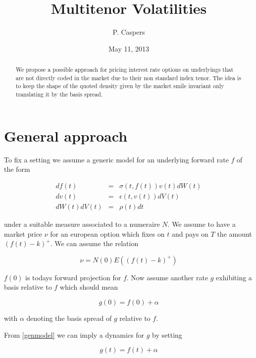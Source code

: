\documentclass{amsart}
\theoremstyle{plain}
\numberwithin{equation}{section}
\begin{document}
\title[Multitenor Volatilities]{Multitenor Volatilities}
\author{P. Caspers}
\date{May 11, 2013}
\begin{abstract}
We propose  a possible approach for pricing interest rate options on underlyings that are not directly coded in the market due to their non standard index tenor. The idea is to keep the shape of the quoted density given by the market smile invariant only translating it by the basis spread. 
\end{abstract}

\maketitle

\section{General approach}
To fix a setting we assume a generic model for an underlying forward rate $f$ of the form

\begin{eqnarray}\label{genmodel}
df(t) &=& \sigma(t,f(t)) v(t) dW(t) \\
dv(t) &=& \epsilon(t,v(t)) dV(t) \\
dW(t) dV(t) &=& \rho(t) dt
\end{eqnarray}

under a suitable measure associated to a numeraire $N$. We assume to have a market price $\nu$ for an european option which fixes on $t$ and pays on $T$ the amount $(f(t)-k)^+$. We can assume the relation

\begin{equation}
\nu = N(0) E( (f(t)-k)^+ )
\end{equation}

$f(0)$ is todays forward projection for $f$. Now assume another rate $g$ exhibiting a basis relative to $f$ which should mean

\begin{equation}
g(0) = f(0) + \alpha
\end{equation}

with $\alpha$ denoting the basis spread of $g$ relative to $f$. 

From \ref{genmodel} we can imply a dynamics for $g$ by setting

\begin{equation}
g(t) = f(t) + \alpha
\end{equation}
\end{document}
